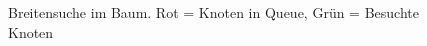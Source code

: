 \documentclass[10pt, a4paper]{article}
\begin{document}
\begin{figure}[htbp]
\begin{center}
    \end{center}
    \caption{%
        Breitensuche im Baum. Rot = Knoten in Queue, Grün = Besuchte Knoten
     }%
   \label{fig:subfigures}
\end{figure}

\begin{figure}[htbp]
     \begin{center}
%
        \\ %
        \\%
        

\end{center}
\end{figure}
\end{document}
